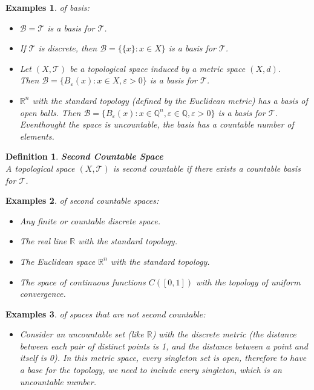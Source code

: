\documentclass[11pt]{book} %
\newtheorem{definition}{Definition}[section]
\newtheorem*{examples*}{Examples}
\begin{document}
\begin{examples*} of basis:
    \begin{itemize}
        \item \( \mathcal{B} = \mathcal{T} \) is a basis for \( \mathcal{T} \).
        \item If \( \mathcal{T} \) is discrete, then \( \mathcal{B} = \{ \{ x \} : x \in X \} \) is a basis for \( \mathcal{T} \).
        \item Let \( (X, \mathcal{T}) \) be a topological space induced by a metric space \( (X, d) \). \\
            Then \( \mathcal{B} = \{ B_\varepsilon(x) : x \in X, \varepsilon > 0 \} \) is a basis for \( \mathcal{T} \).
        \item \( \mathbb{R}^n \) with the standard topology (defined by the Euclidean metric) has a basis of open balls.
            Then \( \mathcal{B} = \{ B_{\varepsilon}(x) : x \in \mathbb{Q}^n, \varepsilon \in \mathbb{Q}, \varepsilon > 0 \} \) is a basis for \( \mathcal{T} \).
            Eventhought the space is uncountable, the basis has a countable number of elements.
    \end{itemize}
\end{examples*}

\begin{definition}{\textbf{Second Countable Space}} \\
    A topological space \( (X, \mathcal{T}) \) is second countable if there exists a countable basis for \( \mathcal{T} \).
\end{definition}


\begin{examples*} of second countable spaces:
    \begin{itemize}
        \item Any finite or countable discrete space.
        \item The real line \( \mathbb{R} \) with the standard topology.
        \item The Euclidean space \( \mathbb{R}^n \) with the standard topology.
        \item The space of continuous functions \( C([0, 1]) \) with the topology of uniform convergence.
    \end{itemize}
\end{examples*}

\begin{examples*} of spaces that are not second countable:
    \begin{itemize}
        \item Consider an uncountable set (like \( \mathbb{R} \)) with the discrete metric (the distance between each pair of distinct
         points is 1, and the distance between a point and itself is 0). 
         In this metric space, every singleton set is open, therefore to have a base for the topology, we need to include every singleton,
         which is an uncountable number.
    \end{itemize}
    
\end{examples*}
\end{document}
